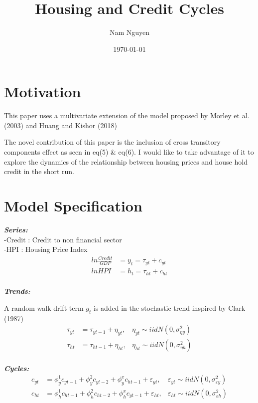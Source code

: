 \documentclass[fleqn]{article}
\title{Housing and Credit Cycles}
\author{Nam Nguyen}
\date{\today}
\begin{document}
	\maketitle
	
	\begin{outline}[enumerate]
		
		\section{Motivation}
		
		This paper uses a multivariate extension of the model proposed by Morley et al. (2003) and Huang and Kishor (2018)
		
		The novel contribution of this paper is the inclusion of cross transitory components effect as seen in eq(5) \& eq(6). I would like to take advantage of it to explore the dynamics of the relationship between housing prices and house hold credit in the short run.
		
		\section {Model Specification}
		
		\textbf{\textit{Series:}} \\
		-Credit : Credit to non financial sector\\
		-HPI : Housing Price Index
		\begin{align}
		ln \frac{Credit}{GDP} &= y_t = \tau_{yt} + c_{yt}
		\\
		ln HPI &= h_t = \tau_{ht} + c_{ht}
		\end{align}
		\\
		\textbf{\textit{Trends:}}
		
		A random walk drift term $g_t$ is added in the stochastic trend inspired by Clark (1987)
		\begin{align}
		\tau_{yt} &= \tau_{yt-1} + \eta_{yt}, &\eta_{yt} \sim iidN(0,\sigma^2_{\eta y})
		\\
		\tau_{ht} &= \tau_{ht-1} + \eta_{ht}, &\eta_{ht} \sim iidN(0,\sigma^2_{\eta h})	
		\end{align}
		\\
		\textbf{\textit{Cycles:}}
		\begin{align}
		c_{yt} &= \phi^1_{y}c_{yt-1}  
		+ \phi^2_{y}c_{yt-2}  
		+ \phi^x_{y}c_{ht-1} 
		+ \varepsilon_{yt},
		&\varepsilon_{yt} \sim iidN(0,\sigma^2_{\varepsilon y})		   
		\\
		c_{ht} &= \phi^1_{h}c_{ht-1}  
		+ \phi^2_{h}c_{ht-2}
		+ \phi^x_{h}c_{yt-1}  
		+ \varepsilon_{ht},
		&\varepsilon_{ht} \sim iidN(0,\sigma^2_{\varepsilon h})
		\end{align}
		\\
		

\end{outline}
\end{document}
